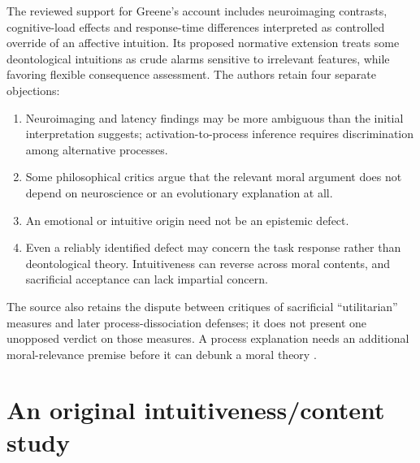 The reviewed support for Greene's account includes neuroimaging contrasts,
cognitive-load effects and response-time differences interpreted as
controlled override of an affective intuition. Its proposed normative
extension treats some deontological intuitions as crude alarms sensitive
to irrelevant features, while favoring flexible consequence assessment.
The authors retain four separate objections:
\begin{enumerate}
\item Neuroimaging and latency findings may be more ambiguous than the
      initial interpretation suggests; activation-to-process inference
      requires discrimination among alternative processes.
\item Some philosophical critics argue that the relevant moral argument
      does not depend on neuroscience or an evolutionary explanation at all.
\item An emotional or intuitive origin need not be an epistemic defect.
\item Even a reliably identified defect may concern the task response
      rather than deontological theory. Intuitiveness can reverse across
      moral contents, and sacrificial acceptance can lack impartial concern.
\end{enumerate}
The source also retains the dispute between critiques of sacrificial
``utilitarian'' measures and later process-dissociation defenses; it does
not present one unopposed verdict on those measures. A process explanation
needs an additional moral-relevance premise before it can debunk a moral
theory \parencite[p.~702]{WiegmannSauer2021MoralJudgment}.

\section{An original intuitiveness/content study}
\label{sec:p11-r123-kahane}

